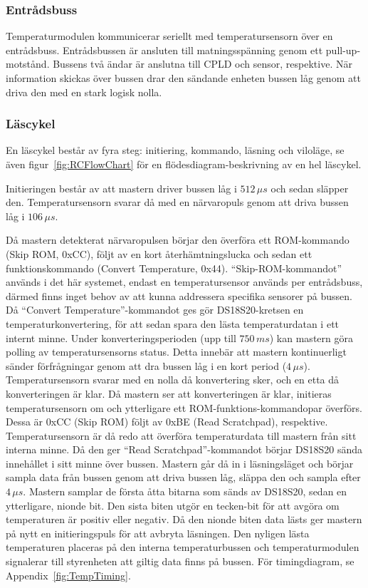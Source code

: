 \documentclass[a4paper,11pt]{article}
\begin{document}
	\subsubsection{Entrådsbuss}

	Temperaturmodulen kommunicerar seriellt med temperatursensorn över en entrådsbuss.
	Entrådsbussen är ansluten till matningsspänning genom ett pull-up-motstånd.
	Bussens två ändar är anslutna till CPLD och sensor, respektive. När information
	skickas över bussen drar den sändande enheten bussen låg genom att driva den
	med en stark logisk nolla.

	\subsubsection{Läscykel}

	En läscykel består av fyra steg: initiering, kommando, läsning och viloläge,
	se även figur~\ref{fig:RCFlowChart} för en flödesdiagram-beskrivning av en hel läscykel.

	Initieringen består av att mastern driver bussen låg i $512 \, \mu s$ och sedan släpper den.
	Temperatursensorn svarar då med en närvaropuls genom att driva bussen låg i $106 \, \mu s$.

	Då mastern detekterat närvaropulsen börjar den överföra ett ROM-kommando (Skip ROM, 0xCC), följt av en kort återhämtningslucka och sedan ett funktionskommando (Convert Temperature, 0x44).
	``Skip-ROM-kommandot'' används i det här systemet, endast en temperatursensor används per entrådsbuss, därmed finns inget behov av att kunna addressera specifika sensorer på bussen.
	Då ``Convert Temperature''-kommandot ges gör DS18S20-kretsen en temperaturkonvertering, för att sedan spara den lästa temperaturdatan i ett internt minne.
	Under konverteringsperioden (upp till $750 \, m s$) kan mastern göra polling av temperatursensorns status. Detta innebär att mastern kontinuerligt
	sänder förfrågningar genom att dra bussen låg i en kort period ($4 \, \mu s$). Temperatursensorn svarar med en nolla
	då konvertering sker, och en etta då konverteringen är klar.
	Då mastern ser att konverteringen är klar, initieras temperatursensorn om och ytterligare ett ROM-funktions-kommandopar överförs. Dessa är 0xCC (Skip ROM) följt av 0xBE (Read Scratchpad), respektive.
	Temperatursensorn är då redo att överföra temperaturdata till mastern från sitt interna minne.
	Då den ger ``Read Scratchpad''-kommandot börjar DS18S20 sända innehållet i sitt minne över bussen.
	Mastern går då in i läsningsläget och börjar sampla data från bussen genom att driva bussen låg, släppa den och sampla efter $4 \, \mu s$.
	Mastern samplar de första åtta bitarna som sänds av DS18S20, sedan en ytterligare, nionde bit. 
	Den sista biten utgör en tecken-bit för att avgöra om temperaturen är positiv eller negativ. Då den nionde biten data lästs
	ger mastern på nytt en initieringspuls för att avbryta läsningen.
	Den nyligen lästa temperaturen placeras på den interna temperaturbussen och temperaturmodulen signalerar till styrenheten att giltig data finns på bussen. För timingdiagram, se Appendix~\ref{fig:TempTiming}.
\end{document}
